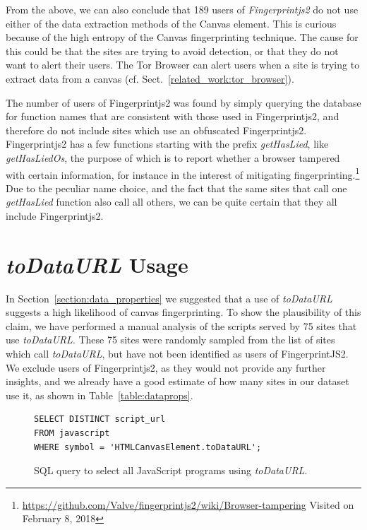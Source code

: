 \documentclass[
    fontsize=12pt,
    headings=small,
    parskip=half,
    bibliography=totoc,
    numbers=noenddot,
    open=any
    ]{scrreprt}
\begin{document}
From the above, we can also conclude that 189 users of \textit{Fingerprintjs2}
do not use either of the data extraction methods of the Canvas element. This is curious because
of the high entropy of the Canvas fingerprinting technique.
The cause for this could be that the sites are trying to avoid detection, or that they
do not want to alert their users. The Tor Browser can alert users when a site is trying
to extract data from a canvas (cf. Sect.~\ref{related_work:tor_browser}).

The number of users of Fingerprintjs2 was found by simply querying the database for function names that are consistent with
those used in Fingerprintjs2, and therefore do not include sites which use an obfuscated Fingerprintjs2.
Fingerprintjs2 has a few functions starting with the prefix \textit{getHasLied}, like \textit{getHasLiedOs}, the purpose
of which is to report whether a browser tampered with certain information, for instance in the interest of mitigating
fingerprinting.\footnote{\url{https://github.com/Valve/fingerprintjs2/wiki/Browser-tampering} Visited on February 8, 2018}
Due to the peculiar name choice, and the fact that the same sites that call one \textit{getHasLied}
function also call all others, we can be quite certain that they all include Fingerprintjs2.


\section{\textit{toDataURL} Usage}
\label{sec:todataurl}
In Section~\ref{section:data_properties} we suggested that a use of \textit{toDataURL}
suggests a high likelihood of canvas fingerprinting.
To show the plausibility of this claim, we have performed a manual analysis of the scripts served by
75 sites that use \textit{toDataURL}.
These 75 sites were randomly sampled from the list of sites which call \textit{toDataURL},
but have not been identified as users of FingerprintJS2. We exclude users of Fingerprintjs2,
as they would not provide any further insights, and we already have a good estimate
of how many sites in our dataset use it, as shown in Table~\ref{table:dataprops}.

\begin{figure}
\centering
\begin{verbatim}
SELECT DISTINCT script_url
FROM javascript
WHERE symbol = 'HTMLCanvasElement.toDataURL';
\end{verbatim}
\caption{SQL query to select all JavaScript programs using \textit{toDataURL}.}
\label{code:todataurl_users_query}
\end{figure}
\end{document}
